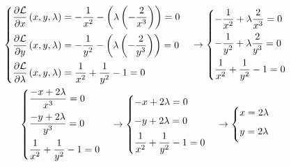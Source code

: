\documentclass[a4paper]{article}
\begin{document}
	\begin{gather*}
		\begin{cases}
			\dfrac{\partial \mathcal{L}}{\partial x}\left(x,y,\lambda\right) = -\dfrac{1}{x^{2}} -\left(\lambda\left(-\dfrac{2}{x^{3}}\right)\right) = 0 \vspace{.5em} \\
			\dfrac{\partial \mathcal{L}}{\partial y}\left(x,y,\lambda\right) = -\dfrac{1}{y^{2}} -\left(\lambda\left(-\dfrac{2}{y^{3}}\right)\right) = 0\vspace{.5em} \\
			\dfrac{\partial \mathcal{L}}{\partial \lambda}\left(x,y,\lambda\right) = \dfrac{1}{x^{2}} + \dfrac{1}{y^{2}} - 1 = 0 \\
		\end{cases}
		\rightarrow
		\begin{cases}
			-\dfrac{1}{x^{2}} + \lambda\dfrac{2}{x^{3}} = 0 \vspace{.5em} \\
			-\dfrac{1}{y^{2}} + \lambda\dfrac{2}{y^{3}} = 0\vspace{.5em} \\
			\dfrac{1}{x^{2}} + \dfrac{1}{y^{2}} - 1 = 0 \\
		\end{cases}
		\\
		\begin{cases}
			\dfrac{-x + 2\lambda}{x^{3}} = 0 \vspace{.5em} \\
			\dfrac{-y + 2\lambda}{y^{3}} = 0 \vspace{.5em} \\
			\dfrac{1}{x^{2}} + \dfrac{1}{y^{2}} - 1 = 0 \\
		\end{cases}
		\rightarrow
		\begin{cases}
			-x + 2\lambda = 0 \vspace{.5em} \\
			-y + 2\lambda = 0 \vspace{.5em} \\
			\dfrac{1}{x^{2}} + \dfrac{1}{y^{2}} - 1 = 0 \\
		\end{cases}
		\rightarrow
		\begin{cases}
			x = 2\lambda \vspace{.5em} \\
			y = 2\lambda \vspace{.5em} \\

\end{cases}
\end{gather*}
\end{document}
